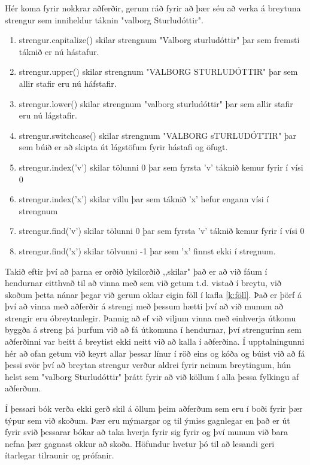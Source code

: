 Hér koma fyrir nokkrar aðferðir, gerum ráð fyrir að þær séu að verka á breytuna strengur sem inniheldur táknin "valborg Sturludóttir".
\vspace{5px}
\begin{enumerate}
	\item strengur.capitalize() skilar strengnum "Valborg sturludóttir" þar sem fremsti táknið er nú hástafur.
	\item strengur.upper() skilar strengnum "VALBORG STURLUDÓTTIR" þar sem allir stafir eru nú háfstafir.
	\item strengur.lower() skilar strengnum "valborg sturludóttir" þar sem allir stafir eru nú lágstafir.
	\item strengur.switchcase() skilar strengnum "VALBORG sTURLUDÓTTIR" þar sem búið er að skipta út lágstöfum fyrir hástafi og öfugt.
	\item strengur.index('v') skilar tölunni 0 þar sem fyrsta 'v' táknið kemur fyrir í vísi 0
	\item strengur.index('x') skilar villu þar sem táknið 'x' hefur engann vísi í strengnum
	\item strengur.find('v') skilar tölunni 0 þar sem fyrsta 'v' táknið kemur fyrir í vísi 0
	\item strengur.find('x') skilar tölvunni -1 þar sem 'x' finnst ekki í stregnum. 
\end{enumerate}
\vspace{10px}

Takið eftir því að þarna er orðið lykilorðið ,,skilar" það er að við fáum í hendurnar eitthvað til að vinna með sem við getum t.d. vistað í breytu, við skoðum þetta nánar þegar við gerum okkar eigin föll í kafla \ref{k:föll}.
Það er þörf á því að vinna með aðferðir á strengi með þessum hætti því að við munum að strengir eru óbreytanlegir.
Þannig að ef við viljum vinna með einhverja útkomu byggða á streng þá þurfum við að fá útkomuna í hendurnar, því strengurinn sem aðferðinni var beitt á breytist ekki neitt við að kalla í aðferðina.
Í upptalningunni hér að ofan getum við keyrt allar þessar línur í röð eins og kóða og búist við að fá þessi svör því að breytan strengur verður aldrei fyrir neinum breytingum, hún helst sem "valborg Sturludóttir" þrátt fyrir að við köllum í alla þessa fylkingu af aðferðum.

Í þessari bók verða ekki gerð skil á öllum þeim aðferðum sem eru í boði fyrir þær týpur sem við skoðum.
Þær eru mýmargar og til ýmiss gagnlegar en það er út fyrir svið þessarar bókar að taka hverja fyrir sig fyrir og því munum við bara nefna þær gagnast okkur að skoða.
Höfundur hvetur þó til að lesandi geri ítarlegar tilraunir og prófanir.

